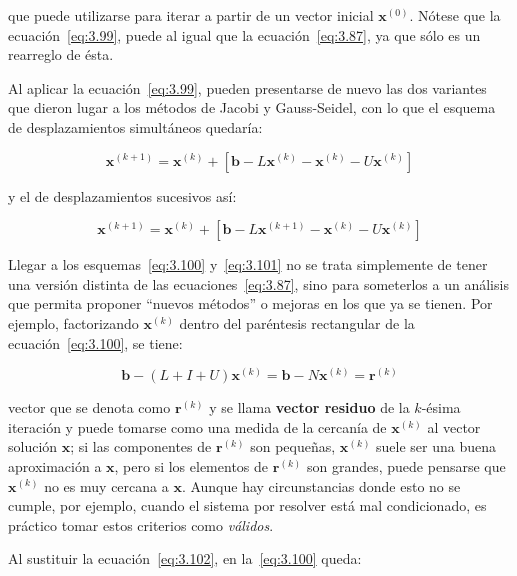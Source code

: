 \documentclass[12pt,letterpaper]{article}
\theoremstyle{definition}
\theoremstyle{plain}
\theoremstyle{remark}
\begin{document}
que puede utilizarse para iterar a partir de un vector inicial $\mathbf{x}^{(0)}$. Nótese que la ecuación~\eqref{eq:3.99}, puede al igual que la ecuación~\eqref{eq:3.87}, ya que sólo es un rearreglo de ésta.

Al aplicar la ecuación~\eqref{eq:3.99}, pueden presentarse de nuevo las dos variantes que dieron lugar a los métodos de Jacobi y Gauss-Seidel, con lo que el esquema de desplazamientos simultáneos quedaría:

\begin{equation}
\mathbf{x}^{(k+1)} = \mathbf{x}^{(k)} + \left[\mathbf{b} - L \mathbf{x}^{(k)} - \mathbf{x}^{(k)} - U \mathbf{x}^{(k)} \right]
\label{eq:3.100}
\tag{20}
\end{equation}

y el de desplazamientos sucesivos así:

\begin{equation}
\mathbf{x}^{(k+1)} = \mathbf{x}^{(k)} + \left[\mathbf{b} - L \mathbf{x}^{(k+1)} - \mathbf{x}^{(k)} - U \mathbf{x}^{(k)} \right]
\label{eq:3.101}
\tag{21}
\end{equation}

Llegar a los esquemas~\eqref{eq:3.100} y~\eqref{eq:3.101} no se trata simplemente de tener una versión distinta de las ecuaciones~\eqref{eq:3.87}, sino para someterlos a un análisis que permita proponer “nuevos métodos” o mejoras en los que ya se tienen. Por ejemplo, factorizando $\mathbf{x}^{(k)}$ dentro del paréntesis rectangular de la ecuación~\eqref{eq:3.100}, se tiene:

\begin{equation}
\mathbf{b} - (L + I + U)\mathbf{x}^{(k)} = \mathbf{b} - N \mathbf{x}^{(k)} = \mathbf{r}^{(k)}
\label{eq:3.102}
\tag{22}
\end{equation}

vector que se denota como $\mathbf{r}^{(k)}$ y se llama \textbf{vector residuo} de la $k$-ésima iteración y puede tomarse como una medida de la cercanía de $\mathbf{x}^{(k)}$ al vector solución $\mathbf{x}$; si las componentes de $\mathbf{r}^{(k)}$ son pequeñas, $\mathbf{x}^{(k)}$ suele ser una buena aproximación a $\mathbf{x}$, pero si los elementos de $\mathbf{r}^{(k)}$ son grandes, puede pensarse que $\mathbf{x}^{(k)}$ no es muy cercana a $\mathbf{x}$. Aunque hay circunstancias donde esto no se cumple, por ejemplo, cuando el sistema por resolver está mal condicionado, es práctico tomar estos criterios como \textit{válidos}.

Al sustituir la ecuación~\eqref{eq:3.102}, en la~\eqref{eq:3.100} queda:
\end{document}

